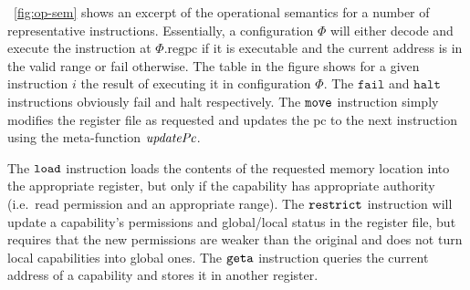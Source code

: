 \documentclass[compsoc,conference,letterpaper,fleqn]{IEEEtran}
\newcommand{\update}[2]{[#1 \mapsto #2]}
\newcommand{\sem}[1]{\left\llbracket #1 \right\rrbracket}
\newcommand{\var}[1]{\mathit{#1}}
\newcommand{\lv}{\var{r}}
\newcommand{\gl}{\var{g}}
\newcommand{\pcreg}{\mathrm{pc}}
\newcommand{\addr}{\var{a}}
\newcommand{\start}{\var{b}}
\newcommand{\addrend}{\var{e}}
\newcommand{\perm}{\var{perm}}
\newcommand{\permp}{\var{permPair}}
\newcommand{\stdcap}[1][(\perm,\gl)]{\left(#1,\start,\addrend,\addr \right)}
\newcommand{\plainproj}[1]{\mathrm{#1}}
\newcommand{\memreg}[1][\Phi]{#1.\plainproj{reg}}
\newcommand{\updateHeap}[3][\Phi]{#1\update{\plainproj{mem}.#2}{#3}}
\newcommand{\updateReg}[3][\Phi]{#1\update{\plainproj{reg}.#2}{#3}}
\newcommand{\plainfun}[2]{
  \ifthenelse{\equal{#2}{}}
  {\mathit{#1}}
  {\mathit{#1}(#2)}
}
\newcommand{\decodePermPair}{\plainfun{decodePermPair}}
\newcommand{\updatePcPerm}[1]{\plainfun{updatePcPerm}{#1}}
\newcommand{\stdUpdatePc}[1]{\plainfun{updatePc}{#1}}
\newcommand{\refreg}[1]{#1}
\newcommand{\refheap}[1]{#1}
\newcommand{\zinstr}[1]{\mathtt{#1}}
\newcommand{\fail}{\zinstr{fail}}
\newcommand{\halt}{\zinstr{halt}}
\newcommand{\oneinstr}[2]{
  \ifthenelse{\equal{#2}{}}
  {\zinstr{#1}}
  {\zinstr{#1} \; #2}
}
\newcommand{\jmp}[1]{\oneinstr{jmp}{#1}}
\newcommand{\twoinstr}[3]{
  \ifthenelse{\equal{#2#3}{}}
  {\zinstr{#1}}
  {\zinstr{#1} \; #2 \; #3}
}
\newcommand{\restricttwo}[2]{\twoinstr{restrict}{#1}{#2}}
\newcommand{\geta}[2]{\twoinstr{geta}{#1}{#2}}
\newcommand{\move}[2]{\twoinstr{move}{#1}{#2}}
\newcommand{\store}[2]{\twoinstr{store}{#1}{#2}}
\newcommand{\load}[2]{\twoinstr{load}{#1}{#2}}
\newcommand{\plainperm}[1]{\mathrm{#1}}
\newcommand{\readwrite}{\plainperm{rw}}
\newcommand{\rwx}{\plainperm{rwx}}
\newcommand{\readwritel}{\plainperm{rwl}}
\newcommand{\rwlx}{\plainperm{rwlx}}
\newcommand{\local}{\plainperm{local}}
\begin{document}

\figurename~\ref{fig:op-sem} shows an excerpt of the operational semantics for a
number of representative instructions. Essentially, a configuration $\Phi$ will
either decode and execute the instruction at $\memreg{\pcreg}$ if it is
executable and the current address is in the valid range or fail otherwise. The
table in the figure shows for a given instruction $i$ the result of executing it
in configuration $\Phi$. The $\fail$ and $\halt$ instructions obviously fail and
halt respectively. The $\move{}{}$ instruction simply modifies the register file
as requested and updates the $\pcreg$ to the next instruction using the
meta-function $\stdUpdatePc{}$.

The $\load{}{}$ instruction loads the contents of the requested memory location
into the appropriate register, but only if the capability has appropriate
authority (i.e.\ read permission and an appropriate range). The $\restricttwo{}{}$
instruction will update a capability's permissions and global/local status in
the register file, but requires that the new permissions are weaker than the
original and does not turn local capabilities into global ones. The $\geta{}{}$
instruction queries the current address of a capability and stores it in another
register.
\end{document}
